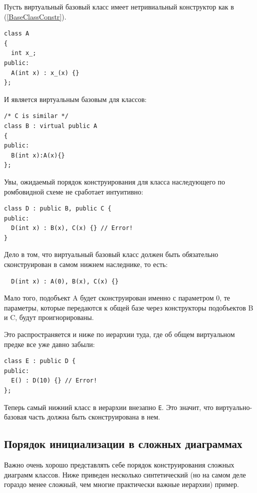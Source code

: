 \documentclass[a4paper,12pt,oneside]{book}
\begin{document}
Пусть виртуальный базовый класс имеет нетривиальный конструктор как в (\ref{BaseClassConstr}).

\begin{lstlisting}
class A 
{
  int x_;
public:
  A(int x) : x_(x) {}
};
\end{lstlisting}

И является виртуальным базовым для классов:

\begin{lstlisting}
/* C is similar */
class B : virtual public A
{
public:
  B(int x):A(x){}
};
\end{lstlisting}

Увы, ожидаемый порядок конструирования для класса наследующего по ромбовидной схеме не сработает интуитивно:

\begin{lstlisting}
class D : public B, public C {
public:
  D(int x) : B(x), C(x) {} // Error!
}
\end{lstlisting}

Дело в том, что виртуальный базовый класс должен быть обязательно сконструирован в самом нижнем наследнике, то есть:

\begin{lstlisting}
  D(int x) : A(0), B(x), C(x) {} 
\end{lstlisting}

Мало того, подобъект A будет сконструирован именно с параметром 0, те параметры, которые передаются к общей базе через конструкторы подобъектов B и C, будут проигнорированы.

Это распространяется и ниже по иерархии туда, где об общем виртуальном предке все уже давно забыли:

\begin{lstlisting}
class E : public D {
public:
  E() : D(10) {} // Error!
};
\end{lstlisting}

Теперь самый нижний класс в иерархии внезапно \lstinline!E!. Это значит, что виртуально-базовая часть должна быть сконструирована в нем.

\subsection{Порядок инициализации в сложных диаграммах}\label{InitOrder}

Важно очень хорошо представлять себе порядок конструирования сложных диаграмм классов. Ниже приведен несколько синтетический (но на самом деле гораздо менее сложный, чем многие практически важные иерархии) пример.
\end{document}
